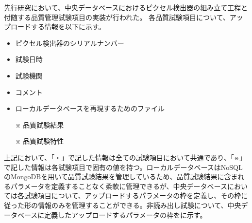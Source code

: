 先行研究において、中央データベースにおけるピクセル検出器の組み立て工程と付随する品質管理試験項目の実装が行われた。
各品質試験項目について、アップロードする情報を以下に示す。
\begin{itemize}
  \item ピクセル検出器のシリアルナンバー
  \item 試験日時
  \item 試験機関
  \item コメント
  \item ローカルデータベースを再現するためのファイル
  \item[※] 品質試験結果
  \item[※] 品質試験特性
\end{itemize}
上記において、「・」で記した情報は全ての試験項目において共通であり、「※」で記した情報は各試験項目で固有の値を持つ。ローカルデータベースはNoSQLのMongoDBを用いて品質試験結果を管理しているため、品質試験結果に含まれるパラメータを定義することなく柔軟に管理できるが、中央データベースにおいては各試験項目について、アップロードするパラメータの枠を定義し、その枠に従った形の情報のみを管理することができる。非読み出し試験について、中央データベースに定義したアップロードするパラメータの枠をに示す。

